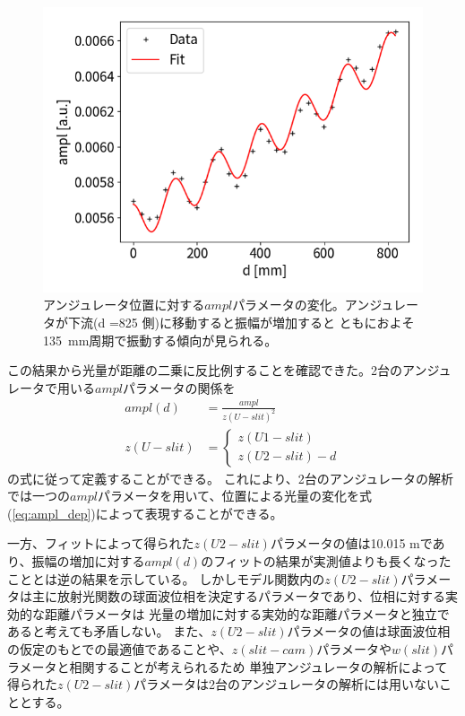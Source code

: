 \documentclass[a4paper,11pt,uplatex]{jsbook}
\begin{document}
\begin{figure}[h]
  \centering
  \includegraphics[width=0.8\linewidth]{image/4-DCampl.png}
  \caption[アンジュレータ位置依存性]{アンジュレータ位置に対する$ampl$パラメータの変化。アンジュレータが下流(d =825 側)に移動すると振幅が増加すると
  ともにおよそ135~mm周期で振動する傾向が見られる。}\label{DCampl}
\end{figure}

この結果から光量が距離の二乗に反比例することを確認できた。2台のアンジュレータで用いる$ampl$パラメータの関係を
\begin{align}
  ampl(d) &= \frac{ampl}{z(U-slit)^2}\label{eq:ampl_dep}\\
   z(U-slit) & = 
  \begin{cases}
     z(U1-slit)\\
     z(U2-slit) - d
  \end{cases}
\end{align}
の式に従って定義することができる。
これにより、2台のアンジュレータの解析では一つの$ampl$パラメータを用いて、位置による光量の変化を式(\ref{eq:ampl_dep})によって表現することができる。

一方、フィットによって得られた$z(U2-slit)$パラメータの値は10.015 mであり、振幅の増加に対する$ampl(d)$のフィットの結果が実測値よりも長くなったこととは逆の結果を示している。
しかしモデル関数内の$z(U2-slit)$パラメータは主に放射光関数の球面波位相を決定するパラメータであり、位相に対する実効的な距離パラメータは
光量の増加に対する実効的な距離パラメータと独立であると考えても矛盾しない。
また、$z(U2-slit)$パラメータの値は球面波位相の仮定のもとでの最適値であることや、$z(slit-cam)$パラメータや$w(slit)$パラメータと相関することが考えられるため
単独アンジュレータの解析によって得られた$z(U2-slit)$パラメータは2台のアンジュレータの解析には用いないこととする。
\end{document}
